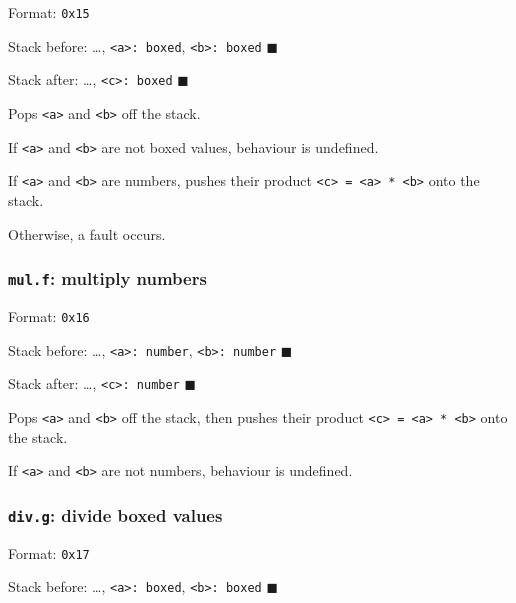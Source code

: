 Format: \texttt{0x15}

Stack before: \ldots, \texttt{\textless{}a\textgreater{}:\ boxed},
\texttt{\textless{}b\textgreater{}:\ boxed} \(\blacksquare\)

Stack after: \ldots, \texttt{\textless{}c\textgreater{}:\ boxed}
\(\blacksquare\)

Pops \texttt{\textless{}a\textgreater{}} and
\texttt{\textless{}b\textgreater{}} off the stack.

If \texttt{\textless{}a\textgreater{}} and
\texttt{\textless{}b\textgreater{}} are not boxed values, behaviour is
undefined.

If \texttt{\textless{}a\textgreater{}} and
\texttt{\textless{}b\textgreater{}} are numbers, pushes their product
\texttt{\textless{}c\textgreater{}\ =\ \textless{}a\textgreater{}\ *\ \textless{}b\textgreater{}}
onto the stack.

Otherwise, a fault occurs.

\subsubsection{\texorpdfstring{\texttt{mul.f}: multiply
numbers}{mul.f: multiply numbers}}

Format: \texttt{0x16}

Stack before: \ldots, \texttt{\textless{}a\textgreater{}:\ number},
\texttt{\textless{}b\textgreater{}:\ number} \(\blacksquare\)

Stack after: \ldots, \texttt{\textless{}c\textgreater{}:\ number}
\(\blacksquare\)

Pops \texttt{\textless{}a\textgreater{}} and
\texttt{\textless{}b\textgreater{}} off the stack, then pushes their
product
\texttt{\textless{}c\textgreater{}\ =\ \textless{}a\textgreater{}\ *\ \textless{}b\textgreater{}}
onto the stack.

If \texttt{\textless{}a\textgreater{}} and
\texttt{\textless{}b\textgreater{}} are not numbers, behaviour is
undefined.

\subsubsection{\texorpdfstring{\texttt{div.g}: divide boxed
values}{div.g: divide boxed values}}

Format: \texttt{0x17}

Stack before: \ldots, \texttt{\textless{}a\textgreater{}:\ boxed},
\texttt{\textless{}b\textgreater{}:\ boxed} \(\blacksquare\)

